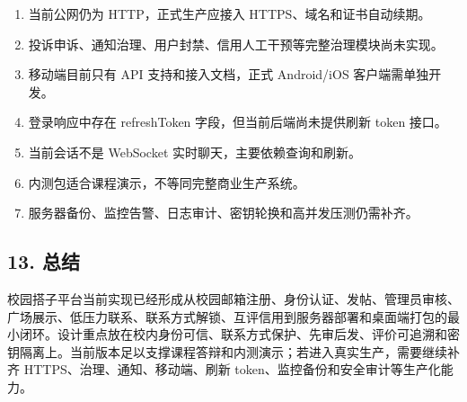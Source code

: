 \documentclass[
]{ctexart}
\providecommand{\tightlist}{%
  \setlength{\itemsep}{0pt}\setlength{\parskip}{0pt}}
\begin{document}
\begin{enumerate}
\def\labelenumi{\arabic{enumi}.}
\tightlist
\item
  当前公网仍为 HTTP，正式生产应接入 HTTPS、域名和证书自动续期。
\item
  投诉申诉、通知治理、用户封禁、信用人工干预等完整治理模块尚未实现。
\item
  移动端目前只有 API 支持和接入文档，正式 Android/iOS 客户端需单独开发。
\item
  登录响应中存在 refreshToken 字段，但当前后端尚未提供刷新 token 接口。
\item
  当前会话不是 WebSocket 实时聊天，主要依赖查询和刷新。
\item
  内测包适合课程演示，不等同完整商业生产系统。
\item
  服务器备份、监控告警、日志审计、密钥轮换和高并发压测仍需补齐。
\end{enumerate}

\hypertarget{ux603bux7ed3}{%
\subsection{13. 总结}\label{ux603bux7ed3}}

校园搭子平台当前实现已经形成从校园邮箱注册、身份认证、发帖、管理员审核、广场展示、低压力联系、联系方式解锁、互评信用到服务器部署和桌面端打包的最小闭环。设计重点放在校内身份可信、联系方式保护、先审后发、评价可追溯和密钥隔离上。当前版本足以支撑课程答辩和内测演示；若进入真实生产，需要继续补齐
HTTPS、治理、通知、移动端、刷新 token、监控备份和安全审计等生产化能力。
\end{document}
